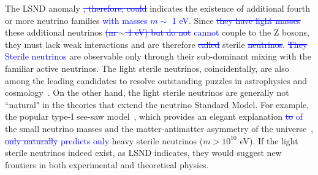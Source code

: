 \documentclass[aps,twocolumn,preprintnumbers,amsmath,superscriptaddress,amssymb,floats,nofootinbib]{revtex4-1}
\begin{document}
The LSND anomaly \textcolor{blue}{\st{, therefore, could}} indicates the existence of additional
fourth or more neutrino families \textcolor{blue}{with masses $m \sim$ 1 eV}. 
Since \textcolor{blue}{\st{they have light masses}} these additional neutrinos 
\textcolor{blue}{\st{(m $\sim$ 1 eV) but do not} cannot} couple to the Z bosons, they must lack weak interactions and are therefore 
\textcolor{blue}{\st{called}} sterile \textcolor{blue}{\st{neutrinos}}. 
\textcolor{blue}{\st{They} Sterile neutrinos} are observable only through their sub-dominant mixing with the familiar active neutrinos. 
The light sterile neutrinos, coincidentally, are also among the leading candidates to resolve outstanding puzzles in astrophysics and 
cosmology~\cite{Dodelson,Kusenko,Wyman,Battye}.
On the other hand, the light sterile neutrinos are generally not ``natural" in the theories that extend the neutrino Standard Model. 
For example, the popular type-I see-saw model~\cite{Minkowski,Yanagida,GellMann,Mohapatra}, 
which provides an elegant explanation \textcolor{blue}{\st{to} of} 
the small neutrino masses and the matter-antimatter asymmetry of the universe~\cite{Fukugita}, 
\textcolor{blue}{\st{only naturally} predicts only} heavy sterile neutrinos ($m >10^{10}$ eV).
If the light sterile neutrinos indeed exist, as LSND indicates, they would suggest new frontiers in both experimental and theoretical physics.
\end{document}

